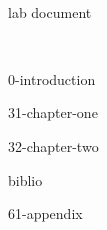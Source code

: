 \newpage ~



\frontmatter %

{lab document} %

\tableofcontents    %
\listoffigures      %
\listoftables       %

\newpage ~ %


{0-introduction}


\mainmatter %


{31-chapter-one}

\nobreakingbeforechapters

{32-chapter-two}

\breakingbeforechapters


\backmatter %
           


{biblio}

\appendix   %


{61-appendix}